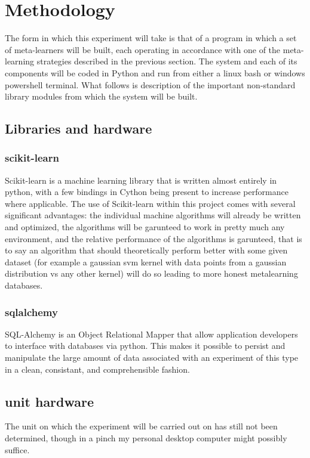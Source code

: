 \documentclass[a4paper,11pt]{article}
\begin{document}
\section{Methodology}
The form in which this experiment will take is that of a program in which a set of meta-learners
will be built, each operating in accordance with one of the meta-learning strategies described in
the previous section. The system and each of its components will be coded in Python and run from either
a linux bash or windows powershell terminal. What follows is description of the important non-standard
library modules from which the system will be built.

\subsection{Libraries and hardware}
\subsubsection{scikit-learn}
Scikit-learn is a machine learning library that is written almost entirely in python, with a few
bindings in Cython being present to increase performance where applicable. The use of Scikit-learn
within this project comes with several significant advantages: the individual machine algorithms
will already be written and optimized, the algorithms will be garunteed to work in pretty much any
environment, and the relative performance of the algorithms is garunteed, that is to say an algorithm
that should theoretically perform better with some given dataset (for example a gaussian svm kernel
with data points from a gaussian distribution vs any other kernel) will do so leading to more honest
metalearning databases.

\subsubsection{sqlalchemy}
SQL-Alchemy is an Object Relational Mapper that allow application developers to interface with
databases via python. This makes it possible to persist and manipulate the large amount of data
associated with an experiment of this type in a clean, consistant, and comprehensible fashion.

\subsection{unit hardware}
The unit on which the experiment will be carried out on has still not been determined, though in
a pinch my personal desktop computer might possibly suffice.
\end{document}
